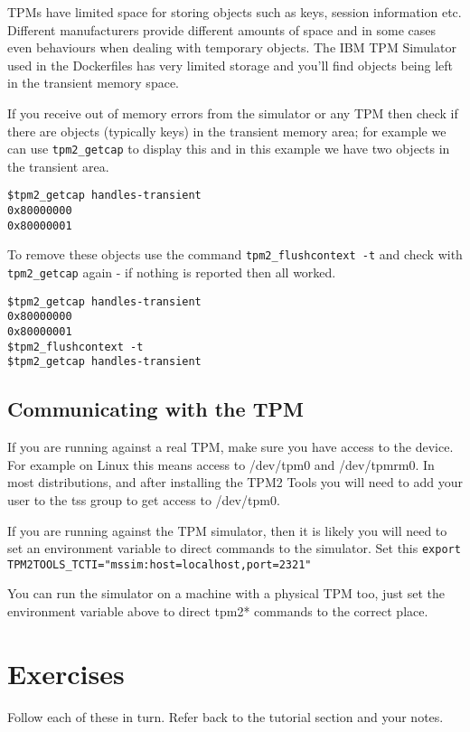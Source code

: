 \documentclass[11pt,a4paper]{article}
\begin{document}
TPMs have limited space for storing objects such as keys, session information etc. Different manufacturers provide different amounts of space and in some cases even behaviours when dealing with temporary objects. The IBM TPM Simulator used in the Dockerfiles has very limited storage and you'll find objects being left in the transient memory space.

If you receive out of memory errors from the simulator or any TPM then check if there are objects (typically keys) in the transient memory area; for example we can use \texttt{tpm2\_getcap} to display this and in this example we have two objects in the transient area.

\begin{verbatim}
$tpm2_getcap handles-transient
0x80000000
0x80000001
\end{verbatim}

To remove these objects use the command \texttt{tpm2\_flushcontext -t} and check with \texttt{tpm2\_getcap} again - if nothing is reported then all worked.

\begin{verbatim}
$tpm2_getcap handles-transient
0x80000000
0x80000001
$tpm2_flushcontext -t
$tpm2_getcap handles-transient
\end{verbatim}

\subsection{Communicating with the TPM}
If you are running against a real TPM, make sure you have access to the device. For example on Linux this means access to /dev/tpm0 and /dev/tpmrm0. In most distributions, and after installing the TPM2 Tools you will need to add your user to the tss group to get access to /dev/tpm0.

If you are running against the TPM simulator, then it is likely you will need to set an environment variable to direct commands to the simulator. Set this \texttt{export TPM2TOOLS\_TCTI="mssim:host=localhost,port=2321"}

You can run the simulator on a machine with a physical TPM too, just set the environment variable above to direct tpm2* commands to the correct place.

\section{Exercises}
Follow each of these in turn. Refer back to the tutorial section and your notes.
\end{document}
